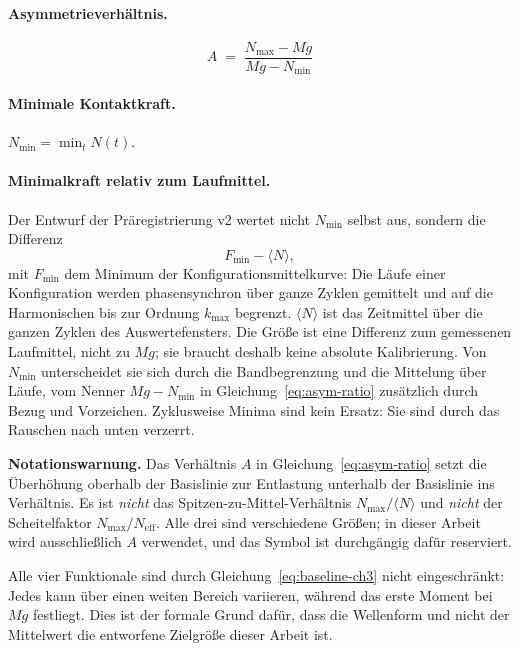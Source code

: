 \documentclass[12pt,a4paper]{report}
\begin{document}
\paragraph{Asymmetrieverhältnis.}
\begin{equation}
  A \;=\; \frac{N_{\max} - Mg}{Mg - N_{\min}}
  \label{eq:asym-ratio}
\end{equation}

\paragraph{Minimale Kontaktkraft.} $N_{\min} = \min_{t} N(t)$.

\paragraph{Minimalkraft relativ zum Laufmittel.} Der Entwurf der
Präregistrierung v2 wertet nicht $N_{\min}$ selbst aus, sondern die
Differenz
\[
  F_{\min} - \langle N \rangle ,
\]
mit $F_{\min}$ dem Minimum der Konfigurationsmittelkurve: Die Läufe einer
Konfiguration werden phasensynchron über ganze Zyklen gemittelt und auf
die Harmonischen bis zur Ordnung $k_{\max}$ begrenzt. $\langle N\rangle$
ist das Zeitmittel über die ganzen Zyklen des Auswertefensters. Die Größe
ist eine Differenz zum gemessenen Laufmittel, nicht zu $Mg$; sie braucht
deshalb keine absolute Kalibrierung. Von $N_{\min}$ unterscheidet sie
sich durch die Bandbegrenzung und die Mittelung über Läufe, vom Nenner
$Mg - N_{\min}$ in Gleichung~\eqref{eq:asym-ratio} zusätzlich durch Bezug
und Vorzeichen. Zyklusweise Minima sind kein Ersatz: Sie sind durch das
Rauschen nach unten verzerrt.

\medskip
\noindent
\textbf{Notationswarnung.} Das Verhältnis $A$ in
Gleichung~\eqref{eq:asym-ratio} setzt die Überhöhung oberhalb der
Basislinie zur Entlastung unterhalb der Basislinie ins Verhältnis. Es ist
\emph{nicht} das Spitzen-zu-Mittel-Verhältnis
$N_{\max}/\langle N \rangle$ und \emph{nicht} der Scheitelfaktor
$N_{\max}/N_{\mathrm{eff}}$. Alle drei sind verschiedene Größen; in
dieser Arbeit wird ausschließlich $A$ verwendet, und das Symbol ist
durchgängig dafür reserviert.

\medskip
\noindent
Alle vier Funktionale sind durch Gleichung~\eqref{eq:baseline-ch3} nicht
eingeschränkt: Jedes kann über einen weiten Bereich variieren, während
das erste Moment bei $Mg$ festliegt. Dies ist der formale Grund dafür,
dass die Wellenform und nicht der Mittelwert die entworfene Zielgröße
dieser Arbeit ist.
\end{document}
